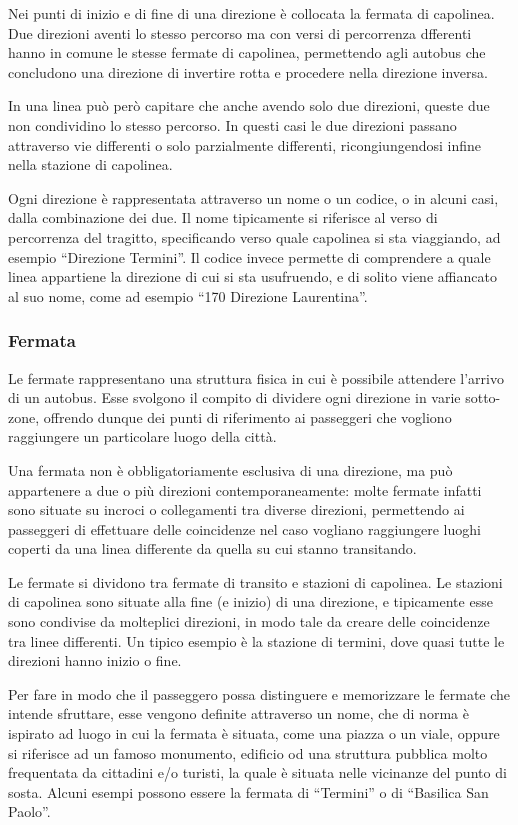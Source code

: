 Nei punti di inizio e di fine di una direzione è collocata la fermata di capolinea. Due direzioni aventi lo stesso percorso ma con versi di percorrenza dfferenti hanno in comune le stesse fermate di capolinea, permettendo agli autobus che concludono una direzione di invertire rotta e procedere nella direzione inversa.

In una linea può però capitare che anche avendo solo due direzioni, queste due non condividino lo stesso percorso. In questi casi le due direzioni passano attraverso vie differenti o solo parzialmente differenti, ricongiungendosi infine nella stazione di capolinea.

Ogni direzione è rappresentata attraverso un nome o un codice, o in alcuni casi, dalla combinazione dei due. Il nome tipicamente si riferisce al verso di percorrenza del tragitto, specificando verso quale capolinea si sta viaggiando, ad esempio ``Direzione Termini''. Il codice invece permette di comprendere a quale linea appartiene la direzione di cui si sta usufruendo, e di solito viene affiancato al suo nome, come ad esempio ``170 Direzione Laurentina''.

\subsubsection{Fermata} %
\label{ssub:fermata}
Le fermate rappresentano una struttura fisica in cui è possibile attendere l'arrivo di un autobus. Esse svolgono il compito di dividere ogni direzione in varie sotto-zone, offrendo dunque dei punti di riferimento ai passeggeri che vogliono raggiungere un particolare luogo della città.

Una fermata non è obbligatoriamente esclusiva di una direzione, ma può appartenere a due o più direzioni contemporaneamente: molte fermate infatti sono situate su incroci o collegamenti tra diverse direzioni, permettendo ai passeggeri di effettuare delle coincidenze nel caso vogliano raggiungere luoghi coperti da una linea differente da quella su cui stanno transitando.

Le fermate si dividono tra fermate di transito e stazioni di capolinea. Le stazioni di capolinea sono situate alla fine (e inizio) di una direzione, e tipicamente esse sono condivise da molteplici direzioni, in modo tale da creare delle coincidenze tra linee differenti. Un tipico esempio è la stazione di termini, dove quasi tutte le direzioni hanno inizio o fine.

Per fare in modo che il passeggero possa distinguere e memorizzare le fermate che intende sfruttare, esse vengono definite attraverso un nome, che di norma è ispirato ad luogo in cui la fermata è situata, come una piazza o un viale, oppure si riferisce ad un famoso monumento, edificio od una struttura pubblica molto frequentata da cittadini e/o turisti, la quale è situata nelle vicinanze del punto di sosta. Alcuni esempi possono essere la fermata di ``Termini'' o di ``Basilica San Paolo''. 

